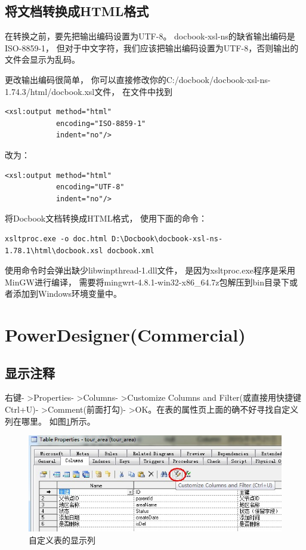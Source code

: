 \documentclass{book}
\begin{document}
\subsection{将文档转换成HTML格式}

 在转换之前，要先把输出编码设置为UTF-8。
 docbook-xsl-ns的缺省输出编码是ISO-8859-1，
 但对于中文字符，我们应该把输出编码设置为UTF-8，否则输出的文件会显示为乱码。

更改输出编码很简单，
你可以直接修改你的C:/docbook/docbook-xsl-ns-1.74.3/html/docbook.xsl文件，
在文件中找到 

\begin{lstlisting}
<xsl:output method="html"
            encoding="ISO-8859-1"
            indent="no"/>
\end{lstlisting}

改为：

\begin{lstlisting}
<xsl:output method="html"
            encoding="UTF-8"
            indent="no"/>
\end{lstlisting}

将Docbook文档转换成HTML格式，
使用下面的命令：

\begin{lstlisting}
xsltproc.exe -o doc.html D:\Docbook\docbook-xsl-ns-1.78.1\html\docbook.xsl docbook.xml
\end{lstlisting}

使用命令时会弹出缺少libwinpthread-1.dll文件，
是因为xsltproc.exe程序是采用MinGW进行编译，
需要将mingwrt-4.8.1-win32-x86\_64.7z包解压到bin目录下或者添加到Windows环境变量中。

\section{PowerDesigner(Commercial)}

\subsection{显示注释}

右键- >Properties- >Columns- >Customize Columns and Filter(或直接用快捷键Ctrl+U)- >Comment(前面打勾)- >OK。在表的属性页上面的确不好寻找自定义列在哪里。
如图\ref{fig:CustomColumnsAndFilter}所示。

\begin{figure}[htbp]
	\centering
	\includegraphics[scale=0.8]{CustomColumnsAndFilter.jpg}
	\caption{自定义表的显示列}
	\label{fig:CustomColumnsAndFilter}
\end{figure}
\end{document}
